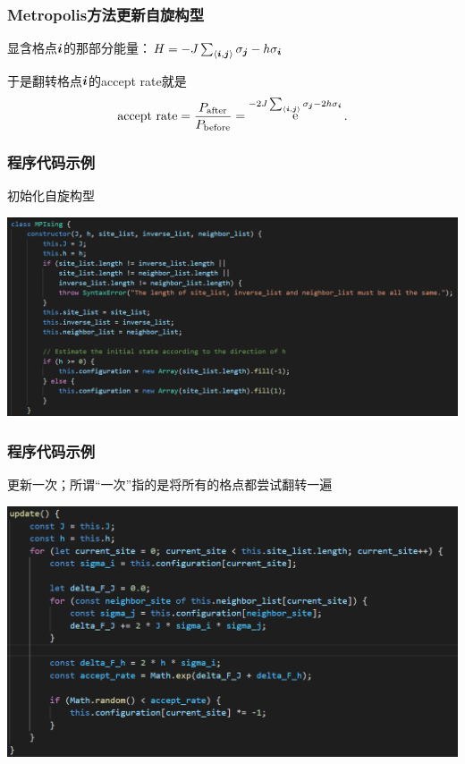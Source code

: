 \documentclass[UTF8]{ctexbeamer}
\DeclareMathOperator{\ee}{e}
\begin{document}
\begin{frame}
\frametitle{Metropolis方法更新自旋构型}

显含格点$\vb*{i}$的那部分能量：$H = - J \sum_{\langle \vb*{i}, \vb*{j} \rangle} \sigma_{\vb*{j}} - h \sigma_{\vb*{i}} $

\begin{center}
     
\end{center}   

于是翻转格点$\vb*{i}$的accept rate就是
\begin{equation}
    \text{accept rate} = \frac{P_\text{after}}{P_\text{before}} = \ee^{- 2 J \sum_{\langle \vb*{i}, \vb*{j} \rangle} \sigma_{\vb*{j}} - 2 h \sigma_{\vb*{i}} }.
\end{equation}

\end{frame}

\begin{frame}
\frametitle{程序代码示例}

初始化自旋构型

\begin{center}
    \includegraphics[width=\textwidth]{code-MPIsing-initial.PNG}
\end{center}

\end{frame}

\begin{frame}
\frametitle{程序代码示例}

更新一次；所谓“一次”指的是将所有的格点都尝试翻转一遍

\begin{center}
    \includegraphics[width=\textwidth]{code-MPIsing-update.PNG}
\end{center}    

\end{frame}
\end{document}
